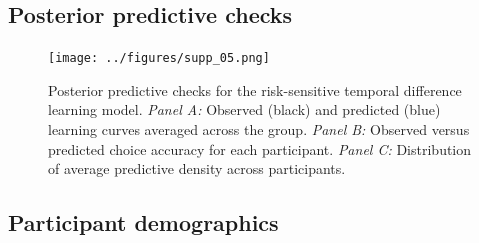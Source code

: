 \documentclass[a4paper,notitlepage,12pt]{article}
\begin{document}
\begin{refsection}[supp]
\clearpage

\subsection*{Posterior predictive checks}

\begin{figure}[H]
\texttt{[image: ../figures/supp\_05.png]}
\centering
\captionsetup{width=0.88\textwidth}
\caption{Posterior predictive checks for the risk-sensitive temporal difference learning model. \textit{Panel A:} Observed (black) and predicted (blue) learning curves averaged across the group. \textit{Panel B:} Observed versus predicted choice accuracy for each participant. \textit{Panel C:} Distribution of average predictive density across participants.}
\label{fig:posterior_check}
\end{figure}

\clearpage

\subsection*{Participant demographics}


\end{refsection}
\end{document}

